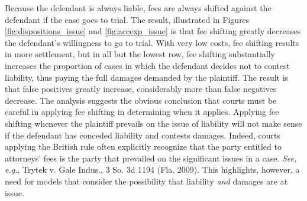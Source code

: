 \documentclass{article}
\begin{document}
Because the defendant is always liable, fees are always shifted against the defendant if the case goes to trial. The result, illustrated in Figures \ref{fig:dispositions_issue} and \ref{fig:accexp_issue} is that fee shifting greatly decreases the defendant's willingness to go to trial. With very low costs, fee shifting results in more settlement, but in all but the lowest row, fee shifting substantially increases the proportion of cases in which the defendant decides not to contest liability, thus paying the full damages demanded by the plaintiff. The result is that false positives greatly increase, considerably more than false negatives decrease. The analysis suggests the obvious conclusion that courts must be careful in applying fee shifting in determining when it applies. Applying fee shifting whenever the plaintiff prevails on the issue of liability will not make sense if the defendant has conceded liability and contests damages. Indeed, courts applying the British rule often explicitly recognize that the party entitled to attorneys' fees is the party that prevailed on the significant issues in a case. \textit{See, e.g.}, Trytek v. Gale Indus., 3 So. 3d 1194 (Fla. 2009). This highlights, however, a need for models that consider the possibility that liability \textit{and} damages are at issue. 
\end{document}
